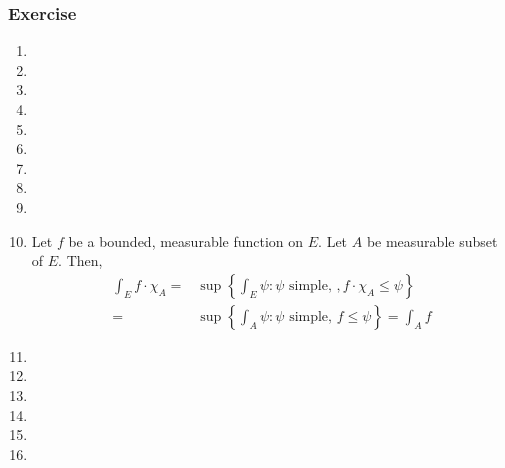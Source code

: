 \subsubsection{Exercise}
\begin{enumerate}
	\item
	\item
	\item
	\item
	\item
	\item
	\item
	\item
	\item
	\item Let $f$ be a bounded, measurable function on $E$.
		Let $A$ be measurable subset of $E$.
		Then,
		\begin{align*}
			\int_E f \cdot \chi_A = & \sup \left\{ \int_E \psi : \psi \text{ simple, }, f\cdot \chi_A \le \psi \right\} \\
			= & \sup \left\{ \int_A \psi : \psi \text{ simple, } f \le \psi \right\} = \int_A f
		\end{align*}
	\item
	\item
	\item
	\item
	\item
	\item
\end{enumerate}

